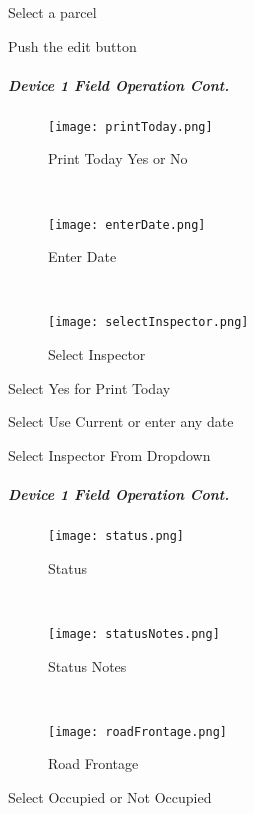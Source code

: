 \documentclass[class=book , crop=false, titlepage, twoside, multi={itemize, figure, verbatim}, float=false]{standalone}
\begin{document}

Select a parcel

\vspace{4in}

{\normalsize Push the} {\Large edit} {\normalsize button}
\clearpage
%
%
%
\subparagraph*{Device 1 Field Operation Cont.}
%
%
\begin{wrapfigure}{r}{0.4\textwidth}
\centering
\texttt{[image: printToday.png]}
\caption {Print Today Yes or No}
\vspace{.2in}

\HRule \\[.4cm] %
\vspace{.1in}

\texttt{[image: enterDate.png]}
\caption{Enter Date}
\vspace{.1in}

\HRule \\[.4cm] %
\vspace{.2in}

\texttt{[image: selectInspector.png]}
\caption{Select Inspector}
\end{wrapfigure}
Select Yes for Print Today
\vspace{2.5in}

\noindent Select Use Current or enter any date
\vspace{2in}

\noindent Select Inspector From Dropdown
\clearpage
%
%
%
\subparagraph*{Device 1 Field Operation Cont.\texorpdfstring{\\}{}}
%
%
\begin{wrapfigure}{r}{0.4\textwidth}
\centering
\texttt{[image: status.png]}
\caption {Status}
\vspace{.1in}

\HRule \\[.4cm] %
\vspace{.1in}

\texttt{[image: statusNotes.png]}
\caption{Status Notes}
\vspace{.1in}

\HRule \\[.4cm] %
\vspace{.1in}

\texttt{[image: roadFrontage.png]}
\caption{Road Frontage}
\end{wrapfigure}
Select Occupied or Not Occupied
\vspace{2in}
\end{document}
